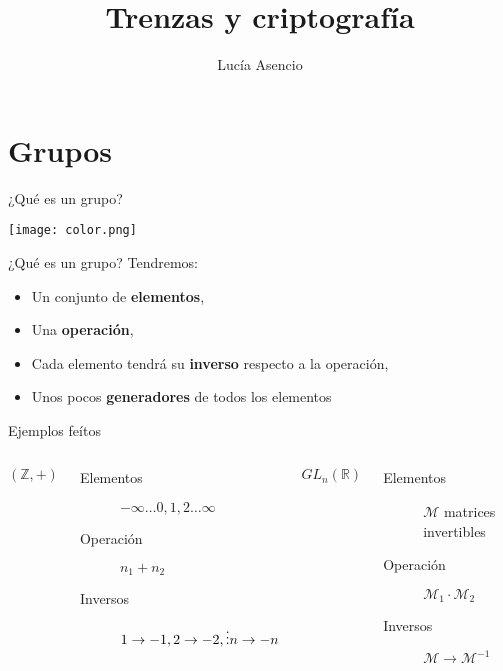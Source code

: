 \documentclass[10pt]{beamer}
\title{Trenzas y criptografía}
\date{}
\author{Lucía Asencio}
\begin{document}
\maketitle


\section{Grupos}

\begin{frame}[fragile]{¿Qué es un grupo?}
\begin{center}
		\texttt{[image: color.png]}
\end{center}
\end{frame}	

\begin{frame}[fragile]{¿Qué es un grupo?}
Tendremos:
  \begin{itemize}
  	\item Un conjunto de \alert{\textbf{elementos}},
  	\item Una \alert{\textbf{operación}}, 
  	\item Cada elemento tendrá su \alert{\textbf{inverso}} respecto a la operación,
  	\item Unos pocos \alert{\textbf{generadores}} de todos los elementos
  
  \end{itemize}
\end{frame}
\begin{frame}[fragile]{Ejemplos feítos}
  	\begin{columns}[T,onlytextwidth]
		$\mathbb{(Z, +)}$
		\begin{description}
			\item[Elementos] $-\infty\ldots0,1,2\ldots\infty $
			\item[Operación] $n_1 + n_2$
			\item[Inversos] $1 \rightarrow -1, \newline2 \rightarrow -2, \newline  \vdots \newline n \rightarrow -n$
		\end{description}
		
		$GL_n\mathbb{(R)}$
		\begin{description}
			\item[Elementos] $\mathcal{M}$ matrices invertibles
			\item[Operación] $\mathcal{M}_1 \cdot \mathcal{M}_2$ 
			\item[Inversos] $\mathcal{M} \rightarrow \mathcal{M}^{-1}$
		\end{description}
		
		
		
	\end{columns}
  
\end{frame}
\end{document}
